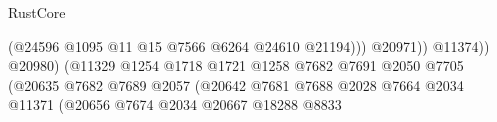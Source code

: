 \begin{lexlean}{RustCore}
\begin{coremodule}
                                                                        (@24596
                                                                          @1095
                                                                          @11
                                                                          @15
                                                                          @7566
                                                                          @6264
                                                                          @24610
                                                                          @21194)))
                                                                    @20971))
                                                                @11374))
                                                            @20980)
                                                          (@11329
                                                            @1254
                                                            @1718
                                                            @1721
                                                            @1258
                                                            @7682
                                                            @7691
                                                            @2050
                                                            @7705
                                                            (@20635
                                                              @7682
                                                              @7689
                                                              @2057
                                                              (@20642
                                                                @7681
                                                                @7688
                                                                @2028
                                                                @7664
                                                                @2034
                                                                @11371
                                                                (@20656
                                                                  @7674
                                                                  @2034
                                                                  @20667
                                                                  @18288
                                                                  @8833

\end{coremodule}
\end{lexlean}
